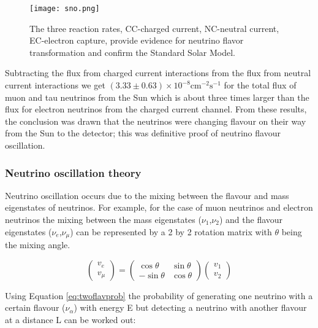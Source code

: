 \documentclass[11pt,oneside,a4paper]{article}
\begin{document}
\begin{figure}[htbp]
	\centering
	\texttt{[image: sno.png]}
	\caption{The three reaction rates, CC-charged current, NC-neutral current, EC-electron capture, provide evidence for
		neutrino flavor transformation and confirm the Standard Solar Model.}
	\label{fig:sno}
\end{figure}


Subtracting the flux from charged current interactions from the flux from neutral current interactions we get $(3.33 \pm 0.63) \times 10^{-8} \mathrm{cm}^{-2} \mathrm{s}^{-1}$ for the total flux of muon and tau neutrinos from the Sun which is about three times larger than the flux for electron neutrinos from the charged current channel. From these results, the conclusion was drawn that the neutrinos were changing flavour on their way from the Sun to the detector; this was definitive proof of neutrino flavour oscillation.

\subsubsection{Neutrino oscillation theory}

Neutrino oscillation occurs due to the mixing between the flavour and mass eigenstates of neutrinos. For example, for the case of muon neutrinos and electron neutrinos the mixing between the mass eigenstates ($\nu_{1}$,$\nu_{2}$) and the flavour eigenstates ($\nu_{e}$,$\nu_{\mu}$) can be represented by a 2 by 2 rotation matrix with $\theta$ being the mixing angle.


\begin{equation}
\label{eq:nuemuematrix}
\left( \begin{array}{l}{v_{e}} \\ {v_{\mu}}\end{array}\right)=\left( \begin{array}{cc}{\cos \theta} & {\sin \theta} \\ {-\sin \theta} & {\cos \theta}\end{array}\right) \left( \begin{array}{c}{v_{1}} \\ {v_{2}}\end{array}\right)
\end{equation}

Using Equation \ref{eq:twoflavprob} the probability of generating one neutrino with a certain flavour ($\nu_{\alpha}$) with energy E but detecting a neutrino with another flavour at a distance L can be worked out:
\end{document}
